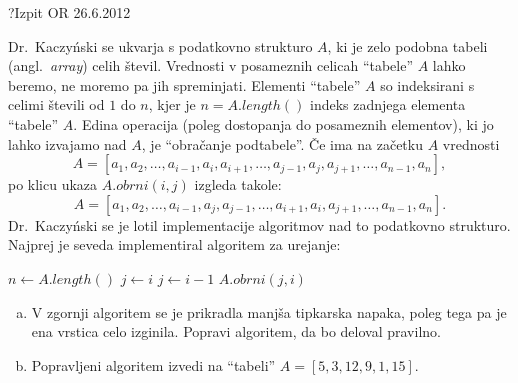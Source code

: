 \begin{naloga}{?}{Izpit OR 26.6.2012}
\begin{vprasanje}
Dr.~Kaczyński se ukvarja s podatkovno strukturo $A$,
ki je zelo podobna tabeli (angl.~{\em array}) celih števil.
Vrednosti v posameznih celicah ``tabele'' $A$ lahko beremo,
ne moremo pa jih spreminjati.
Elementi ``tabele'' $A$ so indeksirani s celimi števili od $1$ do $n$,
kjer je $n = A.length()$ indeks zadnjega elementa ``tabele'' $A$.
Edina operacija (poleg dostopanja do posameznih elementov),
ki jo lahko izvajamo nad $A$, je ``obračanje podtabele''.
Če ima na začetku $A$ vrednosti
$$
A = [a_1, a_2, \dots, a_{i-1}, a_i, a_{i+1}, \dots, a_{j-1}, a_j, a_{j+1},
     \dots, a_{n-1}, a_n],
$$
po klicu ukaza $A.obrni(i, j)$ izgleda takole:
$$
A = [a_1, a_2, \dots, a_{i-1}, a_j, a_{j-1}, \dots, a_{i+1}, a_i, a_{j+1},
     \dots, a_{n-1}, a_n] .
$$
Dr.~Kaczyński se je lotil implementacije algoritmov
nad to podatkovno strukturo.
Najprej je seveda implementiral algoritem za urejanje:
\begin{small}
\begin{algorithmic}
\State $n \gets A.length()$
    \State $j \gets i$
        \State $j \gets i-1$
    \EndWhile
    \State $A.obrni(j, i)$
        \State
    \EndIf
\EndFor
\end{algorithmic}
\end{small}

\begin{enumerate}[(a)]
\item V zgornji algoritem se je prikradla manjša tipkarska napaka,
poleg tega pa je ena vrstica celo izginila.
Popravi algoritem, da bo deloval pravilno.

\item Popravljeni algoritem izvedi na ``tabeli'' $A = [5, 3, 12, 9, 1, 15]$.
\end{enumerate}
\end{vprasanje}
\begin{odgovor}
\end{odgovor}
\end{naloga}


